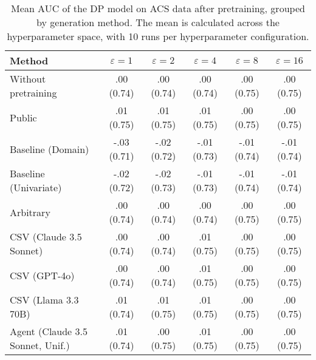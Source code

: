 \begin{table}[h!]
    \centering
    \caption{Mean AUC of the DP model on ACS data after pretraining, grouped by generation method. The mean is calculated across the hyperparameter space, with 10 runs per hyperparameter configuration.}
    \label{tab:epsilon_comparison}
    \begin{tabular}{lccccc}
    \toprule
    Method & $\varepsilon=1$ & $\varepsilon=2$ & $\varepsilon=4$ & $\varepsilon=8$ & $\varepsilon=16$ \\
    \midrule
    Without pretraining & .00 {\small (0.74)} & .00 {\small (0.74)} & .00 {\small (0.74)} & .00 {\small (0.75)} & .00 {\small (0.75)} \\
    \arrayrulecolor{black!50!}\midrule
    Public & \cellcolor{gold!30}.01 {\small (0.75)} & \cellcolor{gold!30}.01 {\small (0.75)} & \cellcolor{gold!30}.01 {\small (0.75)} & \cellcolor{silver!30}.00 {\small (0.75)} & \cellcolor{gold!30}.00 {\small (0.75)} \\
    \arrayrulecolor{black!50!}\midrule
    Baseline (Domain) & -.03 {\small (0.71)} & -.02 {\small (0.72)} & -.01 {\small (0.73)} & -.01 {\small (0.74)} & -.01 {\small (0.74)} \\
    Baseline (Univariate) & -.02 {\small (0.72)} & -.02 {\small (0.73)} & -.01 {\small (0.73)} & -.01 {\small (0.74)} & -.01 {\small (0.74)} \\
    \arrayrulecolor{black!50!}\midrule
    Arbitrary & .00 {\small (0.74)} & .00 {\small (0.74)} & .00 {\small (0.74)} & .00 {\small (0.75)} & .00 {\small (0.75)} \\
    \arrayrulecolor{black!50!}\midrule
    CSV (Claude 3.5 Sonnet) & .00 {\small (0.74)} & .00 {\small (0.74)} & \cellcolor{bronze!30}.01 {\small (0.75)} & \cellcolor{gold!30}.00 {\small (0.75)} & \cellcolor{gold!30}.00 {\small (0.75)} \\
    CSV (GPT-4o) & .00 {\small (0.74)} & \cellcolor{bronze!30}.00 {\small (0.74)} & \cellcolor{bronze!30}.01 {\small (0.75)} & \cellcolor{gold!30}.00 {\small (0.75)} & \cellcolor{gold!30}.00 {\small (0.75)} \\
    CSV (Llama 3.3 70B) & \cellcolor{gold!30}.01 {\small (0.74)} & \cellcolor{silver!30}.01 {\small (0.75)} & \cellcolor{silver!30}.01 {\small (0.75)} & \cellcolor{gold!30}.00 {\small (0.75)} & \cellcolor{gold!30}.00 {\small (0.75)} \\
    \arrayrulecolor{black!50!}\midrule
    Agent (Claude 3.5 Sonnet, Unif.) & \cellcolor{silver!30}.01 {\small (0.74)} & \cellcolor{bronze!30}.00 {\small (0.75)} & \cellcolor{bronze!30}.01 {\small (0.75)} & \cellcolor{bronze!30}.00 {\small (0.75)} & \cellcolor{silver!30}.00 {\small (0.75)} \\

\end{tabular}
\end{table}

